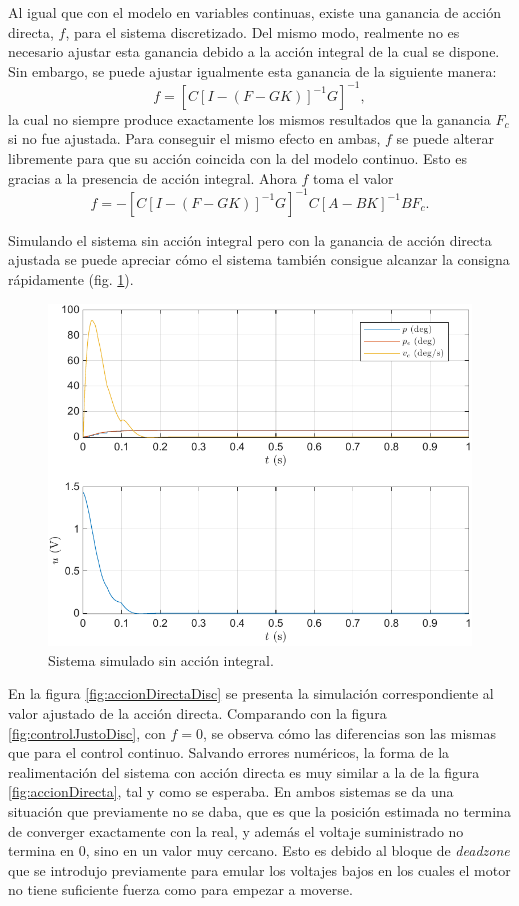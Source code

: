 \documentclass{article}
\begin{document}
Al igual que con el modelo en variables continuas, existe una ganancia de acción directa, $f$, para el sistema discretizado. Del mismo modo, realmente no es necesario ajustar esta ganancia debido a la acción integral de la cual se dispone. Sin embargo, se puede ajustar igualmente esta ganancia de la siguiente manera:
\begin{equation}
    f = \left[ C\left[ I-(F-GK) \right]^{-1}G \right]^{-1},
\end{equation}
la cual no siempre produce exactamente los mismos resultados que la ganancia $F_c$ si no fue ajustada. Para conseguir el mismo efecto en ambas, $f$ se puede alterar libremente para que su acción coincida con la del modelo continuo. Esto es gracias a la presencia de acción integral. Ahora $f$ toma el valor
\begin{equation}
    f = -\left[C\left[I-(F-GK) \right]^{-1}G\right]^{-1}C\left[A-BK\right]^{-1}BF_c.
\end{equation}

Simulando el sistema sin acción integral pero con la ganancia de acción directa ajustada se puede apreciar cómo el sistema también consigue alcanzar la consigna rápidamente (fig. \ref{fig:sinAccionIntegral}).

\begin{figure}[H]
    \centering
    \includegraphics[width=0.75\linewidth]{img/sinAccionIntegral.pdf}
    \caption{Sistema simulado sin acción integral.}
    \label{fig:sinAccionIntegral}
\end{figure}

En la figura \ref{fig:accionDirectaDisc} se presenta la simulación correspondiente al valor ajustado de la acción directa. Comparando con la figura \ref{fig:controlJustoDisc}, con $f=0$, se observa cómo las diferencias son las mismas que para el control continuo. Salvando errores numéricos, la forma de la realimentación del sistema con acción directa es muy similar a la de la figura \ref{fig:accionDirecta}, tal y como se esperaba. En ambos sistemas se da una situación que previamente no se daba, que es que la posición estimada no termina de converger exactamente con la real, y además el voltaje suministrado no termina en 0, sino en un valor muy cercano. Esto es debido al bloque de \textit{deadzone} que se introdujo previamente para emular los voltajes bajos en los cuales el motor no tiene suficiente fuerza como para empezar a moverse.
\end{document}
